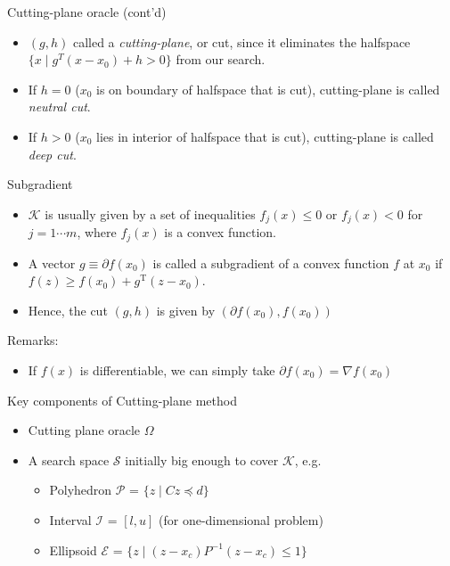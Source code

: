 \documentclass[10pt,ignorenonframetext,serif,onlymath]{beamer}
\providecommand{\tightlist}{%
  \setlength{\itemsep}{0pt}\setlength{\parskip}{0pt}}
\begin{document}
\begin{frame}{Cutting-plane oracle (cont’d)}
\protect\hypertarget{sec:cutting-plane-oracle-contd}{}

\begin{itemize}
\item
  \((g,h)\) called a \emph{cutting-plane}, or cut, since it eliminates
  the halfspace \(\{x \mid g^T (x - x_0) + h > 0\}\) from our search.
\item
  If \(h=0\) (\(x_0\) is on boundary of halfspace that is cut),
  cutting-plane is called \emph{neutral cut}.
\item
  If \(h>0\) (\(x_0\) lies in interior of halfspace that is cut),
  cutting-plane is called \emph{deep cut}.
\end{itemize}

\end{frame}

\begin{frame}{Subgradient}
\protect\hypertarget{sec:subgradient}{}

\begin{itemize}
\tightlist
\item
  \(\mathcal{K}\) is usually given by a set of inequalities
  \(f_j(x) \le 0\) or \(f_j(x) < 0\) for \(j = 1 \cdots m\), where
  \(f_j(x)\) is a convex function.
\item
  A vector \(g \equiv \partial f(x_0)\) is called a subgradient of a
  convex function \(f\) at \(x_0\) if
  \(f(z) \geq f(x_0) + g^\mathrm{T} (z - x_0)\).
\item
  Hence, the cut \((g, h)\) is given by \((\partial f(x_0), f(x_0))\)
\end{itemize}

Remarks:

\begin{itemize}
\tightlist
\item
  If \(f(x)\) is differentiable, we can simply take
  \(\partial f(x_0) = \nabla f(x_0)\)
\end{itemize}

\end{frame}

\begin{frame}{Key components of Cutting-plane method}
\protect\hypertarget{sec:key-components-of-cutting-plane-method}{}

\begin{itemize}
\tightlist
\item
  Cutting plane oracle \(\Omega\)
\item
  A search space \(\mathcal{S}\) initially big enough to cover
  \(\mathcal{K}\), e.g.

  \begin{itemize}
  \tightlist
  \item
    Polyhedron \(\mathcal{P}\) = \(\{z \mid C z \preceq d \}\)
  \item
    Interval \(\mathcal{I}\) = \([l, u]\) (for one-dimensional problem)
  \item
    Ellipsoid \(\mathcal{E}\) =
    \(\{z \mid (z-x_c)P^{-1}(z-x_c) \leq 1 \}\)
  \end{itemize}
\end{itemize}

\end{frame}
\end{document}

